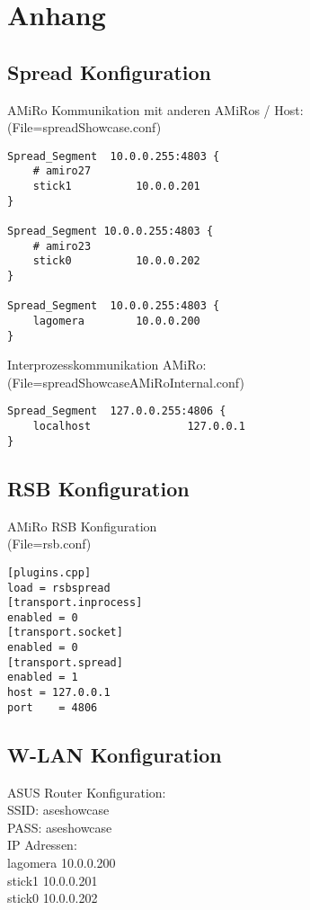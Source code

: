 \chapter{Anhang}

\section{Spread Konfiguration}
\label{sec:spread-config}

AMiRo Kommunikation mit anderen AMiRos / Host:\\
(File=spreadShowcase.conf)

\lstset{language=bash}
\begin{lstlisting}
Spread_Segment  10.0.0.255:4803 {
	# amiro27
	stick1          10.0.0.201
}

Spread_Segment 10.0.0.255:4803 {
	# amiro23    
	stick0          10.0.0.202
}

Spread_Segment  10.0.0.255:4803 {
	lagomera        10.0.0.200
}
\end{lstlisting}

Interprozesskommunikation AMiRo:\\
(File=spreadShowcaseAMiRoInternal.conf)

\begin{lstlisting}
Spread_Segment  127.0.0.255:4806 {
	localhost               127.0.0.1
}
\end{lstlisting}


\section{RSB Konfiguration}
\label{sec:rsb-config}
AMiRo RSB Konfiguration\\
(File=rsb.conf)

\begin{lstlisting}
[plugins.cpp]
load = rsbspread
[transport.inprocess]
enabled = 0
[transport.socket]
enabled = 0
[transport.spread]
enabled = 1
host = 127.0.0.1
port    = 4806
\end{lstlisting}


\section{W-LAN Konfiguration}
\label{sec:wlan-config}
ASUS Router Konfiguration:\\
SSID: aseshowcase\\
PASS: aseshowcase\\

IP Adressen:\\
lagomera 10.0.0.200\\
stick1 10.0.0.201\\
stick0 10.0.0.202\\

